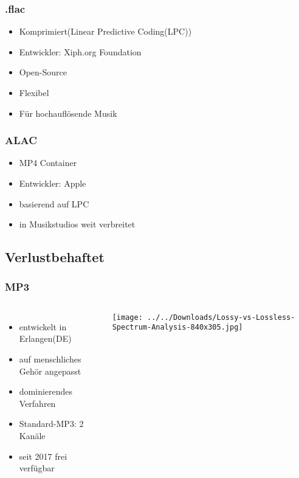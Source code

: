 \documentclass{beamer}
\begin{document}
\begin{frame}
\frametitle{.flac}
\begin{itemize}
	\Large	
	\item Komprimiert(Linear Predictive Coding(LPC))
	\vspace{0.5cm}\item Entwickler: Xiph.org Foundation
	\vspace{0.5cm}\item Open-Source
	\vspace{0.5cm}\item Flexibel
	\vspace{0.5cm}\item Für hochauflösende Musik
\end{itemize}	
\end{frame}

\begin{frame}
\frametitle{ALAC}
\begin{itemize}
	\Large
	\item MP4 Container
	\vspace{0.5cm}\item Entwickler: Apple
	\vspace{0.5cm}\item basierend auf LPC
	\vspace{0.5cm}\item in Musikstudios weit verbreitet
\end{itemize}
\end{frame}
\subsection{Verlustbehaftet}


\begin{frame}
\frametitle{MP3}
\begin{columns}
	\begin{itemize}
		\Large		
		\item entwickelt in Erlangen(DE)
		\vspace{0.5cm}\item auf menschliches Gehör angepasst
		\vspace{0.5cm}\item dominierendes Verfahren
		\vspace{0.5cm}\item Standard-MP3: 2 Kanäle
		\vspace{0.5cm}\item seit 2017 frei verfügbar										
	\end{itemize}
	\texttt{[image: ../../Downloads/Lossy-vs-Lossless-Spectrum-Analysis-840x305.jpg]}  
		 
\end{columns}	
\end{frame}
\end{document}
